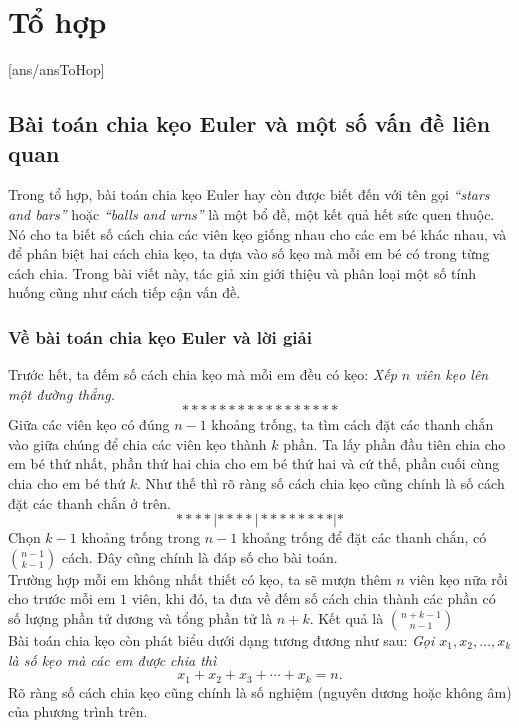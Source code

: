 


\chapter{Tổ hợp}
[ans/ansToHop]
\section{Bài toán chia kẹo Euler và một số vấn đề liên quan}

 Trong tổ hợp, bài toán chia kẹo Euler hay còn được biết đến với tên gọi \textit{``stars and bars''} hoặc \textit{``balls and urns''} là một bổ đề, một kết quả hết sức quen thuộc. Nó cho ta biết số cách chia các viên kẹo giống nhau cho các em bé khác nhau, và để phân biệt hai cách chia kẹo, ta dựa vào số kẹo mà mỗi em bé có trong từng cách chia. Trong bài viết này, tác giả xin giới thiệu và phân loại một số tính huống cũng như cách tiếp cận vấn đề.
 
 

 \subsection{Về bài toán chia kẹo Euler và lời giải}
 Trước hết, ta đếm số cách chia kẹo mà mỗi em đều có kẹo: \textit{Xếp $n$ viên kẹo lên một đường thẳng.}
 $$\ast\ast\ast\ast\ast\ast\ast\ast\ast\ast\ast\ast\ast\ast\ast\ast\ast$$
 Giữa các viên kẹo có đúng $n-1$ khoảng trống, ta tìm cách đặt các thanh chắn vào giữa chúng để chia các viên kẹo thành $k$ phần. Ta lấy phần đầu tiên chia cho em bé thứ nhất, phần thứ hai chia cho em bé thứ hai và cứ thế, phần cuối cùng chia cho em bé thứ $k$. Như thế thì rõ ràng số cách chia kẹo cũng chính là số cách đặt các thanh chắn ở trên.
 $$\ast\ast\ast\ast|\ast\ast\ast\ast|\ast\ast\ast\ast\ast\ast\ast\ast|\ast$$
 Chọn $k-1$ khoảng trống trong $n-1$ khoảng trống để đặt các thanh chắn, có  $\displaystyle{n-1 \choose k-1}$  cách. Đây cũng chính là đáp số cho bài toán.\\
 Trường hợp mỗi em không nhất thiết có kẹo, ta sẽ mượn thêm $n$ viên kẹo nữa rồi cho trước mỗi em $1$ viên, khi đó, ta đưa về đếm số cách chia thành các phần có số lượng phần tử dương và tổng phần tử là $n+k$. Kết quả là $\displaystyle{n+k-1 \choose n-1}$ \\
 Bài toán chia kẹo còn phát biểu dưới dạng tương đương như sau: \textit{Gọi $x_1,x_2,\ldots, x_k$ là số kẹo mà các em được chia thì}
 $$x_1+x_2+x_3+\cdots+x_k=n.$$
 Rõ ràng số cách chia kẹo cũng chính là số nghiệm (nguyên dương hoặc không âm) của phương trình trên.
 
